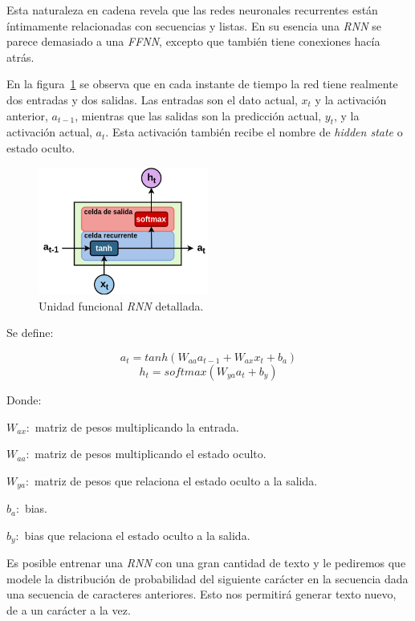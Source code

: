 \documentclass[a4paper,12pt]{article}
\begin{document}
Esta naturaleza en cadena revela que las redes neuronales recurrentes están íntimamente relacionadas con secuencias y listas. En su esencia una \textit{RNN} se parece demasiado a una \textit{FFNN}, excepto que también tiene conexiones hacía atrás.

En la figura~\ref{fig:rnnunitv2} se observa que en cada instante de tiempo la red tiene realmente dos entradas y dos salidas. Las entradas son el dato actual, $x_t$ y la activación anterior, $a_{t-1}$, mientras que las salidas son la predicción actual, $y_t$, y la activación actual, $a_t$. Esta activación también recibe el nombre de \textit{hidden state} o estado oculto.

\begin{figure}[H]
	\begin{center}				
		\includegraphics[width=0.5\textwidth]{rnnunitv2.png}
		\caption{Unidad funcional \textit{RNN} detallada. \citep{olahlstm}}
		\label{fig:rnnunitv2}
	\end{center}
\end{figure}

Se define:

$$ a_{t} = tanh(W_{aa}a_{t-1}+W_{ax}x_t+b_a) $$
$$ h_t = softmax(W_{ya}a_t + b_y) $$

Donde:

$ W_{ax}:$ matriz de pesos multiplicando la entrada.

$ W_{aa}:$ matriz de pesos multiplicando el estado oculto.

$ W_{ya}:$ matriz de pesos que relaciona el estado oculto a la salida.

$b_a:$ bias.

$b_y:$ bias que relaciona el estado oculto a la salida.

Es posible entrenar una \textit{RNN} con una gran cantidad de texto y le pediremos que modele la distribución de probabilidad del siguiente carácter en la secuencia dada una secuencia de caracteres anteriores. Esto nos permitirá generar texto nuevo, de a un carácter a la vez.
\end{document}
